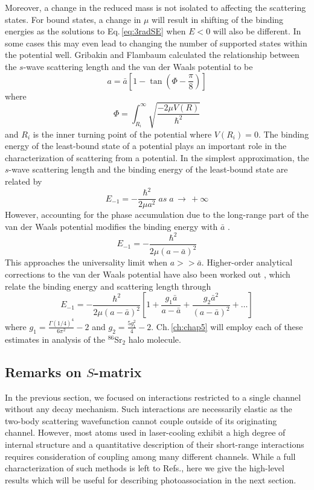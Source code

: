 Moreover, a change in the reduced mass is not isolated to affecting the scattering states.
For bound states, a change in $\mu$ will result in shifting of the binding energies as the solutions to Eq.\,\ref{eq:3radSE} when $E<0$ will also be different.
In some cases this may even lead to changing the number of supported states within the potential well.
Gribakin and Flambaum \cite{gfl93} calculated the relationship between the $s$-wave scattering length and the van der Waals potential to be
\begin{equation}
	a = \bar{a} \left[ 1 - \tan(\Phi - \frac{\pi}{8}) \right]
\end{equation} 
where
\begin{equation}
	\Phi = \int_{R_i}^{\infty} \sqrt{\frac{-2\mu V(R)}{\hbar^2}}
\end{equation}
and $R_i$ is the inner turning point of the potential where $V(R_i)=0$.
The binding energy of the least-bound state of a potential plays an important role in the characterization of scattering from a potential.
In the simplest approximation, the $s$-wave scattering length and the binding energy of the least-bound state are related by
\begin{equation}
	E_{-1} = -\frac{\hbar^2}{2 \mu a^2} \; as \; a\,\rightarrow\,+\infty
\end{equation}
However, accounting for the phase accumulation due to the long-range part of the van der Waals potential modifies the binding energy with $\bar{a}$ \cite{gfl93}.
\begin{equation}
	E_{-1} = -\frac{\hbar^2}{2\mu(a-\bar{a})^2}
\end{equation}
This approaches the universality limit when $a >> \bar{a}$.
Higher-order analytical corrections to the van der Waals potential have also been worked out \cite{gao04}, which relate the binding energy and scattering length through
\begin{equation}
	E_{-1} = -\frac{\hbar^2}{2\mu(a-\bar{a})^2}\left[1 + \frac{g_1 \bar{a}}{a-\bar{a}} + \frac{g_2 \bar{a}^2}{(a-\bar{a})^2}+\dots \right]
\end{equation}
where $g_1=\frac{\Gamma(1/4)^4}{6 \pi^2} - 2$ and $g_2 = \frac{5 g_1^2}{4} - 2$.
Ch.\,\ref{ch:chap5} will employ each of these estimates in analysis of the $^{86}$Sr$_2$ halo molecule.

\subsection{Remarks on $S$-matrix}
In the previous section, we focused on interactions restricted to a single channel without any decay mechanism.
Such interactions are necessarily elastic as the two-body scattering wavefunction cannot couple outside of its originating channel.
However, most atoms used in laser-cooling exhibit a high degree of internal structure and a quantitative description of their short-range interactions requires consideration of coupling among many different channels.
While a full characterization of such methods is left to Refs.\cite{Nicholson2015a,Hutson2007a,Quemener2012,Chin2010,Alexander2014,Vaillant2014}, here we give the high-level results which will be useful for describing photoassociation in the next section.

